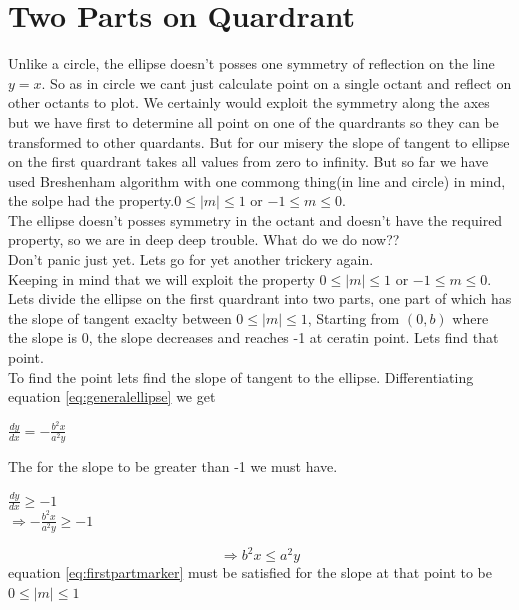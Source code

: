 \documentclass[a4paper,12pt,oneside]{book}
\begin{document}
 \section{Two Parts on Quardrant}
 

 Unlike a circle, the ellipse doesn't posses one symmetry of reflection on the line $y=x$. So as in circle we cant just calculate point on a single octant and reflect on other octants to plot. We certainly would exploit the symmetry along the axes but we have first to determine all point on one of the quardrants so they can be transformed to other quardants. But for our misery the slope of tangent to ellipse on the first quardrant takes all values from zero to infinity. But so far we have used Breshenham algorithm with one commong thing(in line and circle) in mind, the solpe had the property.$0 \leq \vert m \vert \leq 1$ or $-1\leq m \leq 0$. \\
 The ellipse doesn't posses symmetry in the octant and doesn't have the required property, so we are in deep deep trouble. What do we do now??\\
 Don't panic just yet. Lets go for yet another  trickery again.\\

Keeping in mind that we will exploit the property $0 \leq \vert m \vert \leq 1$ or $-1\leq m \leq 0$.  Lets divide the ellipse on the first quardrant into two parts, one part of which has the slope of tangent exaclty between $0 \leq \vert m \vert \leq 1$, Starting from $(0,b)$ where the slope is 0, the slope decreases and reaches -1 at ceratin point. Lets find that point.\\
To find the point lets find the slope of tangent to the ellipse. Differentiating equation \ref{eq:generalellipse} we get

\begin{center}
	$\frac{dy}{dx}=-\frac{b^2x}{a^2y} $
\end{center}
The for the slope to be greater than -1 we must have.
\begin{center}
	$\frac{dy}{dx}\geq -1$\\
	$\Rightarrow -\frac{b^2x}{a^2y} \geq -1$
\end{center}
\begin{equation} \label{eq:firstpartmarker}
	\Rightarrow b^2x\leq a^2y
\end{equation}
equation \ref{eq:firstpartmarker} must be satisfied for the slope at that point to be $0 \leq \vert m \vert \leq 1$
\end{document}
